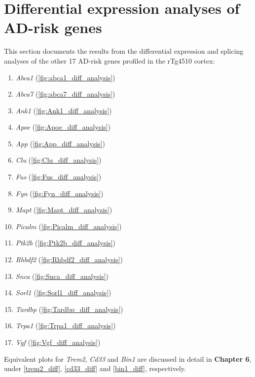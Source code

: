 \cleardoublepage
\chapter{Differential expression analyses of AD-risk genes}\label{app_diff_adrisk_others}

This section documents the results from the differential expression and splicing analyses of the other 17 AD-risk genes profiled in the rTg4510 cortex: 
\begin{multicols}{2}
\begin{enumerate}
	\item \textit{Abca1} (\cref{fig:abca1_diff_analysis})
	\item \textit{Abca7} (\cref{fig:abca7_diff_analysis})
	\item \textit{Ank1} (\cref{fig:Ank1_diff_analysis})
	\item \textit{Apoe} (\cref{fig:Apoe_diff_analysis})
	\item \textit{App} (\cref{fig:App_diff_analysis})
	\item \textit{Clu} (\cref{fig:Clu_diff_analysis})
	\item \textit{Fus} (\cref{fig:Fus_diff_analysis})
	\item \textit{Fyn} (\cref{fig:Fyn_diff_analysis})
	\item \textit{Mapt} (\cref{fig:Mapt_diff_analysis})
	\item \textit{Picalm} (\cref{fig:Picalm_diff_analysis})
	\item \textit{Ptk2b} (\cref{fig:Ptk2b_diff_analysis})
	\item \textit{Rhbdf2} (\cref{fig:Rhbdf2_diff_analysis})
	\item \textit{Snca} (\cref{fig:Snca_diff_analysis})
	\item \textit{Sorl1} (\cref{fig:Sorl1_diff_analysis})
	\item \textit{Tardbp} (\cref{fig:Tardbp_diff_analysis})
	\item \textit{Trpa1} (\cref{fig:Trpa1_diff_analysis})
	\item \textit{Vgf} (\cref{fig:Vgf_diff_analysis})
\end{enumerate}
\end{multicols}
Equivalent plots for \textit{Trem2}, \textit{Cd33} and \textit{Bin1} are discussed in detail in \textbf{Chapter 6}, under \cref{trem2_diff}, \cref{cd33_diff} and \cref{bin1_diff}, respectively.

